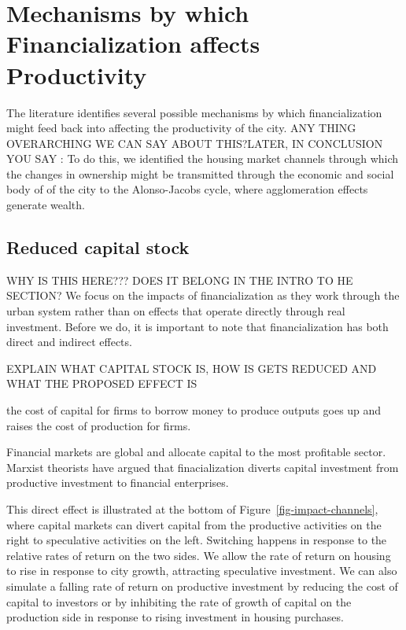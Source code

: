 {\color{red}
\section{Mechanisms by which Financialization affects Productivity}
The literature identifies several possible mechanisms by which financialization might feed back into affecting the productivity of the city. ANY THING OVERARCHING WE CAN SAY ABOUT THIS?LATER, IN CONCLUSION YOU SAY : To do this, we identified the housing market channels through which the changes in ownership might be transmitted through the economic and social body of of the city to the Alonso-Jacobs cycle, where agglomeration effects generate wealth.  }

\subsection{Reduced capital stock}
{\color{red} WHY IS THIS HERE??? DOES IT BELONG IN THE INTRO TO HE SECTION? We focus on the impacts of financialization as they work through the urban system rather than on effects that operate directly through real investment. Before we do, it is important to note that financialization has both direct and indirect effects. 

EXPLAIN WHAT CAPITAL STOCK IS, HOW IS GETS REDUCED AND WHAT THE PROPOSED EFFECT IS

the cost of capital for firms to borrow money to produce outputs goes up and raises the cost of production for firms.}

Financial markets are global and allocate capital to the most profitable sector.  
Marxist theorists \cite{lefebvreRevolutionUrbaine1970, harveyClassmonopolyRentFinance1974, harveyUrbanProcessCapitalism1978, christophersRevisitingUrbanizationCapital2011} have argued that finacialization diverts capital investment from productive investment to financial enterprises. 

This direct effect is illustrated at the bottom of Figure~\ref{fig-impact-channels}, where capital markets can divert capital from the productive activities on the right to speculative activities on the left. Switching happens in response to the relative rates of return on the two sides.  We allow the rate of return on housing to rise in response to city growth, attracting speculative investment. We can also simulate a falling rate of return on productive investment by reducing the cost of capital to investors or by inhibiting the rate of growth of capital on the production side in response to rising investment in housing purchases. %



